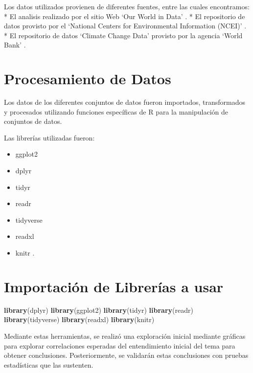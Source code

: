 \documentclass[
]{book}
\newenvironment{Shaded}{\begin{snugshade}}{\end{snugshade}}
\newcommand{\FunctionTok}[1]{\textcolor[rgb]{0.13,0.29,0.53}{\textbf{#1}}}
\newcommand{\NormalTok}[1]{#1}
\providecommand{\tightlist}{%
  \setlength{\itemsep}{0pt}\setlength{\parskip}{0pt}}
\begin{document}
Los datos utilizados provienen de diferentes fuentes, entre las cuales encontramos:
* El analisis realizado por el sitio Web `Our World in Data' \citep{ref1}.
* El repositorio de datos provisto por el `National Centers for Environmental Information (NCEI)' \citep{ref159}.
* El repositorio de datos `Climate Change Data' provisto por la agencia `World Bank' \citep{ref155}.

\section{Procesamiento de Datos}\label{procesamiento-de-datos}

Los datos de los diferentes conjuntos de datos fueron importados, transformados y procesados utilizando funciones específicas de R para la manipulación de conjuntos de datos.

Las librerías utilizadas fueron:

\begin{itemize}
\tightlist
\item
  ggplot2 \citep{R-ggplot2}
\item
  dplyr \citep{R-dplyr}
\item
  tidyr \citep{R-tidyr}
\item
  readr \citep{R-readr}
\item
  tidyverse \citep{R-tidyverse}
\item
  readxl \citep{R-readxl}
\item
  knitr \citep{R-knitr}.
\end{itemize}

\section{Importación de Librerías a usar}\label{importaciuxf3n-de-libreruxedas-a-usar}

\begin{Shaded}
\begin{Highlighting}[]
\FunctionTok{library}\NormalTok{(dplyr)}
\FunctionTok{library}\NormalTok{(ggplot2)}
\FunctionTok{library}\NormalTok{(tidyr)}
\FunctionTok{library}\NormalTok{(readr)}
\FunctionTok{library}\NormalTok{(tidyverse)}
\FunctionTok{library}\NormalTok{(readxl)}
\FunctionTok{library}\NormalTok{(knitr)}
\end{Highlighting}
\end{Shaded}

Mediante estas herramientas, se realizó una exploración inicial mediante gráficas para explorar correlaciones esperadas del entendimiento inicial del tema para obtener conclusiones. Posteriormente, se validarán estas conclusiones con pruebas estadísticas que las sustenten.
\end{document}
